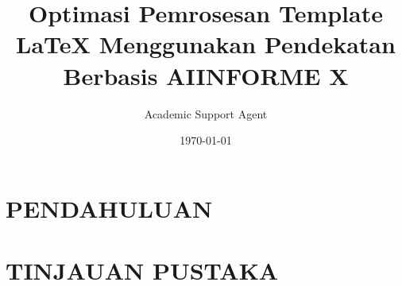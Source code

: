 \documentclass{article}
\title{Optimasi Pemrosesan Template LaTeX Menggunakan Pendekatan Berbasis AI}
\author{Academic Support Agent}
\date{\today}
\begin{document}
\maketitle

\begin{abstract}

\end{abstract}

\chapter{PENDAHULUAN}


\chapter{TINJAUAN PUSTAKA}


\usepackage[utf8]{inputenc}
\usepackage[bitstream-charter]{mathdesign}
\usepackage{ragged2e}
\usepackage[spanish]{babel}%
\usepackage{anysize}%
\marginsize{1cm}{1cm}{2cm}{2cm}
\usepackage{amsmath}%
\usepackage{hyperref}%
\usepackage{textcomp,gensymb}
\usepackage{float}%
\usepackage{lipsum}%
\usepackage{graphicx}
\usepackage{caption}
\usepackage{subcaption}
\usepackage{url}%
\usepackage{multicol}%
\setlength\columnsep{18pt}%
\renewenvironment{abstract}%
 {\par\noindent\textbf{\abstractname}\ \ignorespaces \\}
 {\par\noindent\medskip}

\title{INFORME X}
\end{document}
